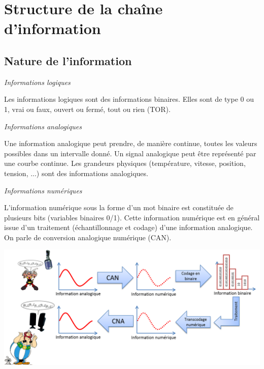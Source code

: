 \documentclass[10pt]{article}
\begin{document}
\section{Structure de la chaîne d'information}
\subsection{Nature de l'information}

\begin{defi}
 \textit{\textsf{Informations logiques}}


Les informations logiques sont des informations binaires. Elles sont de type 0
ou 1, vrai ou faux, ouvert ou fermé, tout ou rien (TOR).

\end{defi}



\begin{defi}
 \textit{\textsf{Informations analogiques}}


Une information analogique peut prendre, de manière continue, toutes les valeurs
possibles dans un intervalle donné. Un signal analogique peut être représenté
par une courbe continue. Les grandeurs physiques (température, vitesse,
position, tension, ...) sont des informations analogiques.


\end{defi}


\begin{defi}
 \textit{\textsf{Informations numériques}}


L'information numérique sous la forme d'un mot binaire est constituée de
plusieurs bits (variables binaires 0/1). Cette information numérique est en
général issue d'un traitement (échantillonnage et codage) d'une information
analogique. On parle de conversion analogique numérique (CAN).

\end{defi}



\begin{exemple}
  \begin{center}
    \includegraphics[width=.9\textwidth]{images/info}
  \end{center}
\end{exemple}
\end{document}
